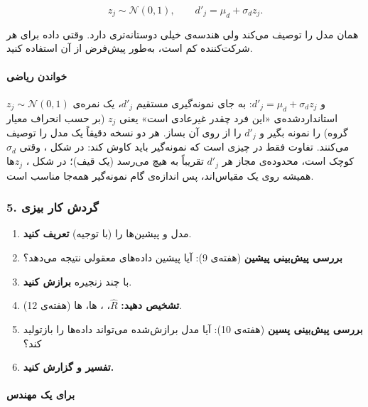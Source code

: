 \[
z_j \sim \mathcal{N}(0, 1), \qquad d'_j = \mu_d + \sigma_d z_j.
\]

همان مدل را توصیف می‌کند ولی هندسه‌ی خیلی دوستانه‌تری دارد. وقتی داده برای
هر شرکت‌کننده کم است، به‌طور پیش‌فرض از آن استفاده کنید.

\paragraph{خواندن ریاضی}

\(z_j \sim \mathcal{N}(0, 1)\) و \(d'_j = \mu_d + \sigma_d z_j\): به جای
نمونه‌گیری مستقیم \(d'_j\)، یک نمره‌ی استانداردشده‌ی «این فرد چقدر غیرعادی
است» یعنی \(z_j\) (بر حسب انحراف معیار گروه) را نمونه بگیر و \(d'_j\) را
از روی آن بساز. هر دو نسخه دقیقاً یک مدل را توصیف می‌کنند. تفاوت فقط در
چیزی است که نمونه‌گیر باید کاوش کند: در شکل ، وقتی
\(\sigma_d\) کوچک است، محدوده‌ی مجاز هر \(d'_j\) تقریباً به هیچ می‌رسد (یک
قیف)؛ در شکل ، \(z_j\)ها همیشه روی یک مقیاس‌اند، پس
اندازه‌ی گام نمونه‌گیر همه‌جا مناسب است.

\subsubsection{5. گردش کار بیزی}

\begin{enumerate}
\def\labelenumi{\arabic{enumi}.}
\tightlist
\item
  مدل و پیشین‌ها را (با توجیه) \textbf{تعریف کنید}.
\item
  \textbf{بررسی پیش‌بینی پیشین} (هفته‌ی 9): آیا پیشین داده‌های معقولی نتیجه
  می‌دهد؟
\item
  با چند زنجیره \textbf{برازش کنید}.
\item
  \textbf{تشخیص دهید:} \(\hat R\)، ، ها،
  ها (هفته‌ی 12).
\item
  \textbf{بررسی پیش‌بینی پسین} (هفته‌ی 10): آیا مدل برازش‌شده می‌تواند
  داده‌ها را بازتولید کند؟
\item
  \textbf{تفسیر و گزارش کنید.}
\end{enumerate}

\paragraph{برای یک مهندس}

